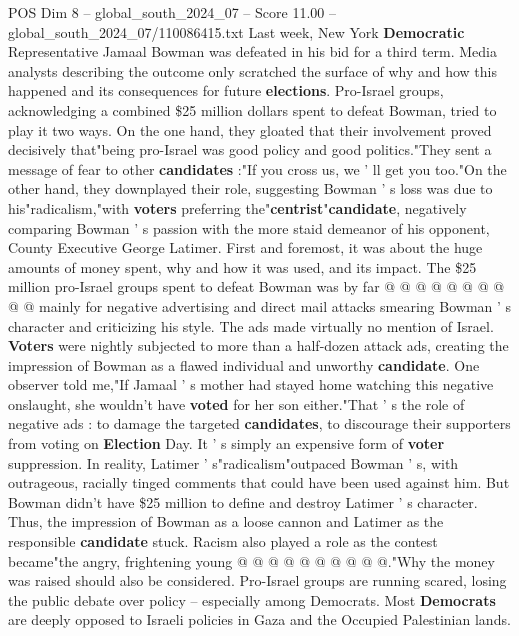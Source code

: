 \begin{textsample}{POS Dim 8 – global\_south\_2024\_07 – Score 11.00 – global\_south\_2024\_07/110086415.txt}  \label{ex:f8_pos_103}
Last week, New York \textbf{Democratic} Representative Jamaal Bowman was defeated in his bid for a third term.
Media analysts describing the outcome only scratched the surface of why and how this happened and its consequences for future \textbf{elections}.
Pro-Israel groups, acknowledging a combined \$25 million dollars spent to defeat Bowman, tried to play it two ways.
On the one hand, they gloated that their involvement proved decisively that"being pro-Israel was good policy and good politics."They sent a message of fear to other \textbf{candidates} :"If you cross us, we ' ll get you too."On the other hand, they downplayed their role, suggesting Bowman ' s loss was due to his"radicalism,"with \textbf{voters} preferring the"\textbf{centrist}"\textbf{candidate}, negatively comparing Bowman ' s passion with the more staid demeanor of his opponent, County Executive George Latimer.
First and foremost, it was about the huge amounts of money spent, why and how it was used, and its impact.
The \$25 million pro-Israel groups spent to defeat Bowman was by far @ @ @ @ @ @ @ @ @ @ mainly for negative advertising and direct mail attacks smearing Bowman ' s character and criticizing his style.
The ads made virtually no mention of Israel. \textbf{Voters} were nightly subjected to more than a half-dozen attack ads, creating the impression of Bowman as a flawed individual and unworthy \textbf{candidate}.
One observer told me,"If Jamaal ' s mother had stayed home watching this negative onslaught, she wouldn't have \textbf{voted} for her son either."That ' s the role of negative ads : to damage the targeted \textbf{candidates}, to discourage their supporters from voting on \textbf{Election} Day.
It ' s simply an expensive form of \textbf{voter} suppression.
In reality, Latimer ' s"radicalism"outpaced Bowman ' s, with outrageous, racially tinged comments that could have been used against him.
But Bowman didn't have \$25 million to define and destroy Latimer ' s character.
Thus, the impression of Bowman as a loose cannon and Latimer as the responsible \textbf{candidate} stuck.
Racism also played a role as the contest became"the angry, frightening young @ @ @ @ @ @ @ @ @ @."Why the money was raised should also be considered.
Pro-Israel groups are running scared, losing the public debate over policy -- especially among Democrats.
Most \textbf{Democrats} are deeply opposed to Israeli policies in Gaza and the Occupied Palestinian lands.

\end{textsample}

